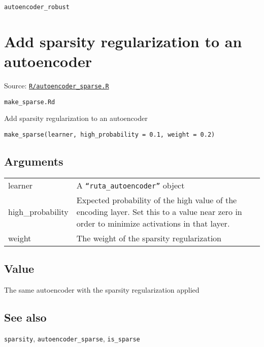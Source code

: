 \texttt{autoencoder\_robust}

\section{Add sparsity regularization to an
autoencoder}\label{add-sparsity-regularization-to-an-autoencoder}

Source:
\href{https://github.com/fdavidcl/ruta/blob/master/R/autoencoder_sparse.R}{\texttt{R/autoencoder\_sparse.R}}

\texttt{make\_sparse.Rd}

Add sparsity regularization to an autoencoder

\begin{verbatim}
make_sparse(learner, high_probability = 0.1, weight = 0.2)
\end{verbatim}

\hypertarget{arguments}{\subsection{\texorpdfstring{\protect\hyperlink{arguments}{}Arguments}{Arguments}}\label{arguments}}

\begin{longtable}[c]{@{}>{\small}p{3cm}>{\raggedright}p{12.5cm}@{}}
\toprule
learner & A \texttt{``ruta\_autoencoder''} object\tabularnewline
high\_probability & Expected probability of the high value of the
encoding layer. Set this to a value near zero in order to minimize
activations in that layer.\tabularnewline
weight & The weight of the sparsity regularization\tabularnewline
\bottomrule
\end{longtable}

\hypertarget{value}{\subsection{\texorpdfstring{\protect\hyperlink{value}{}Value}{Value}}\label{value}}

The same autoencoder with the sparsity regularization applied

\hypertarget{see-also}{\subsection{\texorpdfstring{\protect\hyperlink{see-also}{}See
also}{See also}}\label{see-also}}

\texttt{sparsity}, \texttt{autoencoder\_sparse}, \texttt{is\_sparse}

